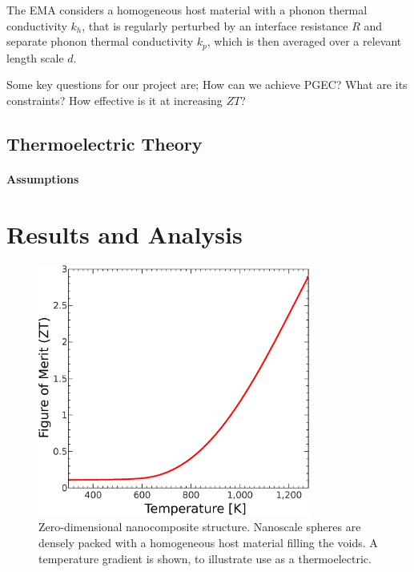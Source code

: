 \documentclass[12pt,draft]{article}
\begin{document}
The EMA considers a homogeneous host material with a phonon thermal conductivity $k_h$, that is regularly perturbed by an interface resistance $R$ and separate phonon thermal conductivity $k_p$, which is then averaged over a relevant length scale $d$.

Some key questions for our project are; How can we achieve \ac{PGEC}? What are its constraints? How effective is it at increasing $ZT$?


\subsection{Thermoelectric Theory}
\paragraph{Assumptions}

\section{Results and Analysis}

\begin{figure}
	\centering
	\includegraphics[width=0.8\textwidth]{ZT-10nm.eps}
	\caption{Zero-dimensional nanocomposite structure. Nanoscale spheres are densely packed with a homogeneous host material filling the voids. A temperature gradient is shown, to illustrate use as a thermoelectric.}
	\label{fig:zt-10nm}
\end{figure}
\end{document}
